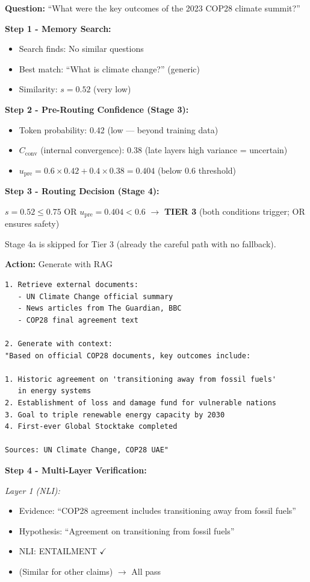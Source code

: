 \documentclass[12pt,a4paper]{article}
\theoremstyle{definition}
\newcommand{\upre}{u_{\text{pre}}}
\newcommand{\Cconv}{C_{\text{conv}}}
\begin{document}
\begin{examplebox}[title=Tier 3: RAG + Comprehensive Verification]

\textbf{Question:} ``What were the key outcomes of the 2023 COP28 climate summit?''

\textbf{Step 1 - Memory Search:}
\begin{itemize}
    \item Search finds: No similar questions
    \item Best match: ``What is climate change?'' (generic)
    \item Similarity: $s = 0.52$ (very low)
\end{itemize}

\textbf{Step 2 - Pre-Routing Confidence (Stage 3):}
\begin{itemize}
    \item Token probability: 0.42 (low — beyond training data)
    \item $\Cconv$ (internal convergence): 0.38 (late layers high variance = uncertain)
    \item $\upre = 0.6 \times 0.42 + 0.4 \times 0.38 = 0.404$ (below 0.6 threshold)
\end{itemize}

\textbf{Step 3 - Routing Decision (Stage 4):}

$s = 0.52 \leq 0.75$ OR $\upre = 0.404 < 0.6$ $\rightarrow$ \textbf{TIER 3} (both conditions trigger; OR ensures safety)

Stage 4a is skipped for Tier 3 (already the careful path with no fallback).

\textbf{Action:} Generate with RAG

\begin{verbatim}
1. Retrieve external documents:
   - UN Climate Change official summary
   - News articles from The Guardian, BBC
   - COP28 final agreement text

2. Generate with context:
"Based on official COP28 documents, key outcomes include:

1. Historic agreement on 'transitioning away from fossil fuels' 
   in energy systems
2. Establishment of loss and damage fund for vulnerable nations
3. Goal to triple renewable energy capacity by 2030
4. First-ever Global Stocktake completed

Sources: UN Climate Change, COP28 UAE"
\end{verbatim}

\textbf{Step 4 - Multi-Layer Verification:}

\textit{Layer 1 (NLI):}
\begin{itemize}
    \item Evidence: ``COP28 agreement includes transitioning away from fossil fuels''
    \item Hypothesis: ``Agreement on transitioning from fossil fuels''
    \item NLI: ENTAILMENT $\checkmark$
    \item (Similar for other claims) $\rightarrow$ All pass
\end{itemize}


\end{examplebox}
\end{document}
